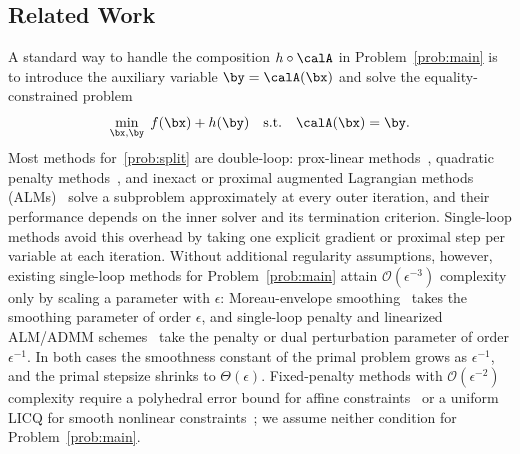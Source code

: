 \subsection{Related Work}

A standard way to handle the composition $h\circ\calA$ in
Problem~\eqref{prob:main} is to introduce the auxiliary variable
$\by=\calA(\bx)$ and solve the equality-constrained problem
\begin{equation}\label{prob:split}
  \min_{\bx,\by}\; f(\bx)+h(\by)\quad\text{s.t.}\quad \calA(\bx)=\by.
\end{equation}
Most methods for~\eqref{prob:split} are double-loop: prox-linear
methods~\cite{Drusvyatskiy2019}, quadratic penalty
methods~\cite{kong2019complexity,lin2022complexity}, and inexact or proximal
augmented Lagrangian methods (ALMs)~\cite{sahin2019inexact,li2021rate,xie2021proximal}
solve a subproblem approximately at every outer iteration, and their
performance depends on the inner solver and its termination criterion.
Single-loop methods avoid this overhead by taking one explicit gradient or
proximal step per variable at each iteration. Without additional regularity
assumptions, however, existing single-loop methods for
Problem~\eqref{prob:main} attain $\mathcal O(\epsilon^{-3})$ complexity only by
scaling a parameter with $\epsilon$: Moreau-envelope
smoothing~\cite{bohm2021variable} takes the smoothing parameter of order
$\epsilon$, and single-loop penalty and linearized ALM/ADMM
schemes~\cite{hajinezhad2019perturbed,luSingleLoopGradientDescent2022,hallak2023adaptive,alacaoglu2024complexity,sun2024dual_descent_alm_admm,elbourkhissi2025perturbed,shi2025momentum}
take the penalty or dual perturbation parameter of order $\epsilon^{-1}$. In
both cases the smoothness constant of the primal problem grows as
$\epsilon^{-1}$, and the primal stepsize shrinks to $\Theta(\epsilon)$.
Fixed-penalty methods with $\mathcal O(\epsilon^{-2})$ complexity require a
polyhedral error bound for affine constraints~\cite{zhang2022global} or a
uniform LICQ for smooth nonlinear
constraints~\cite{elbourkhissi2025linearized,liu2026fixed}; we assume neither
condition for Problem~\eqref{prob:main}.

